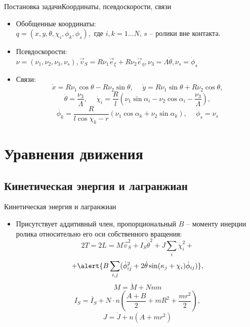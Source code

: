\documentclass{beamer}
\begin{document}
\begin{frame}{Постановка задачи}{Координаты, псевдоскорости, связи}
  \begin{itemize}
  \item {
    Обобщенные координаты: \\
    $q = (x, y, \theta, \chi_i, \phi_k, \phi_s),$ где $i,k = 1\dots N$, $s$ -- ролики вне контакта.
  }
  \item{
    Псевдоскорости:\\
    $\nu = (\nu_1, \nu_2, \nu_3, \nu_s), \vec{v}_S = R\nu_1\vec{e}_\xi + R\nu_2\vec{e}_\eta, \nu_3 = \Lambda\dot{\theta}, \nu_s = \dot{\phi}_s$
  }
  \item {
    Связи:
	$$ \dot{x} = R \nu_1\cos\theta-R\nu_2\sin\theta, \hspace{15pt} \dot{y} = R\nu_1\sin\theta+R\nu_2\cos\theta,$$
	$$\dot{\theta} = \frac{\nu_3}{\Lambda}, \hspace{15pt} \dot{\chi}_i = \frac{R}{l}(\nu_1\sin\alpha_i - \nu_2\cos\alpha_i - \frac{\nu_3}{\Lambda}), $$
	$$ \dot{\phi_k} = \frac{R}{l\cos\chi_k-r}(\nu_1\cos\alpha_k + \nu_2\sin\alpha_k), \hspace{15pt} \dot{\phi}_s = \nu_s $$
  }

  \end{itemize}
\end{frame}

\section{Уравнения движения}

\subsection{Кинетическая энергия и лагранжиан}

\begin{frame}{Кинетическая энергия и лагранжиан}
  \begin{itemize}
  \item {
    Присутствует аддитивный член, пропорциональный $B$ -- моменту инерции ролика относительно его оси собственного вращения:
    $$ 2T = 2L = M\vec{v}_S^2 + I_S\dot{\theta}^2 + J\sum_i\dot{\chi}_i^2 + $$
    $$ + \alert{B\sum_{i,j}(\dot{\phi}_{ij}^2 + 2\dot{\theta}\sin(\kappa_j + \chi_i)\dot{\phi}_{ij})}, $$
    $$ M = \mathring{M} + Nnm $$
    $$ I_S = \mathring{I_S} + N\cdot n(\frac{A+B}{2} + mR^2 + \frac{mr^2}{2}), $$
    $$ J = \mathring{J} + n(A + mr^2) $$
  }

  \end{itemize}
\end{frame}
\end{document}
